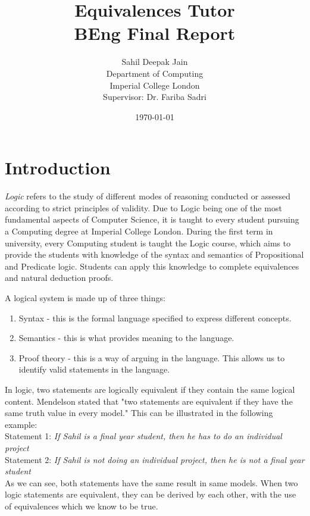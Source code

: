 \documentclass[12pt]{article}
\begin{document}
\title{Equivalences Tutor\\BEng Final Report}

\author{Sahil Deepak Jain\\Department of Computing\\Imperial College London\\Supervisor: Dr. Fariba Sadri}
\date{\today}
\maketitle
\newpage


\begin{abstract}

\end{abstract}
\newpage

\tableofcontents

\newpage
\section{Introduction}

\emph{Logic} refers to the study of different modes of reasoning conducted or 
assessed according to strict principles of validity. Due to Logic being one of 
the most fundamental aspects of Computer Science, it is taught to every student
pursuing a Computing degree at Imperial College London. During the first term 
in university, every Computing student is taught the Logic course, which aims to
provide the students with knowledge of the syntax and semantics of Propositional 
and Predicate logic. Students can apply this knowledge to complete equivalences
and natural deduction proofs.

A logical system is made up of three things:

\begin{enumerate}
  \item Syntax - this is the formal language specified to express different
         concepts.
  \item Semantics - this is what provides meaning to the language.
  \item Proof theory - this is a way of arguing in the language. This allows us
         to identify valid statements in the language.
\end{enumerate}

In logic, two statements are logically equivalent if they contain the same
logical content. Mendelson stated that "two statements are equivalent if they
have the same truth value in every model." This can be illustrated in the 
following example: \\ \bigskip 
Statement 1: \emph{If Sahil is a final year student, 
then he has to do an individual project} \\ \bigskip 
Statement 2: \emph{If Sahil is not 
doing an individual project, then he is not a final year student} \\ \bigskip 
As we can see, both statements have the same result in same models. When two logic 
statements are equivalent, they can be derived by each other, with the use of 
equivalences which we know to be true.
\end{document}
